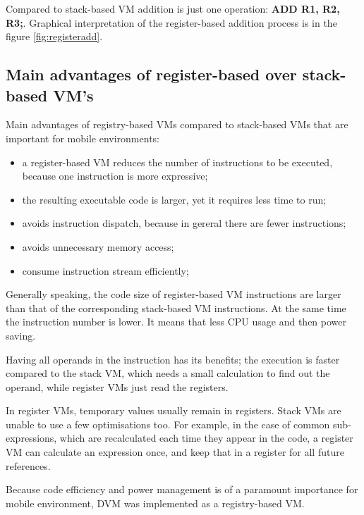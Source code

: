 \documentclass[11pt, oneside]{article}   	%
\begin{document}
Compared to stack-based VM addition is just one operation: \textbf{ADD R1, R2, R3;}. Graphical interpretation of the register-based addition process is in the figure \ref{fig:registeradd}.

\subsection{Main advantages of register-based over stack-based VM's}

Main advantages of registry-based VMs compared to stack-based VMs that are important for mobile environments:
\begin{itemize}
  \itemsep0pt
  \item a register-based VM reduces the number of instructions to be executed, because one instruction is more expressive;
  \item the resulting executable code is larger, yet it requires less time to run;
  \item avoids instruction dispatch, because in gereral there are fewer instructions;
  \item avoids unnecessary memory access;
  \item consume instruction stream efficiently;
\end{itemize}

Generally speaking, the code size of register-based VM instructions are larger than that of the 
corresponding stack-based VM instructions. At the same time the instruction number is lower. It means that less CPU usage and then power saving. 

Having all operands in the instruction has its benefits; the execution is faster compared to the stack VM, which needs a small calculation to find out the operand, while register VMs just read the registers.

In register VMs, temporary values usually remain in registers. Stack VMs are unable to use a few optimisations too. For example, in the case of common sub-expressions, which are recalculated each time they appear in the code, a register VM can calculate an expression once, and keep that in a register for all future references.

Because code efficiency and power management is of a paramount importance for mobile environment, DVM was implemented as a registry-based VM.
\end{document}
